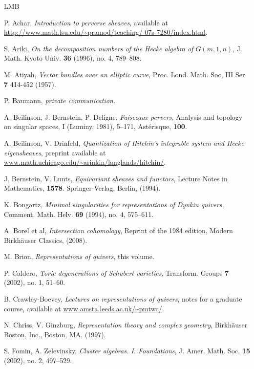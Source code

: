 \documentclass[a4paper,10pt]{amsart}
\numberwithin{equation}{section}
\begin{document}
\small{\begin{thebibliography}{LMB}

  P. Achar, \emph{Introduction to perverse sheaves}, available at \url{http://www.math.lsu.edu/~pramod/teaching/ 07s-7280/index.html}.

S. Ariki, \emph{On the decomposition numbers of the Hecke algebra of $G(m,1,n)$},
J. Math. Kyoto Univ. \textbf{36} (1996), no. 4, 789--808. 

M. Atiyah, \emph{Vector bundles over an elliptic curve}, Proc. Lond. Math. Soc, III Ser. \textbf{7} 414-452 (1957).

P. Baumann, \textit{private communication.}

A. Beilinson, J. Bernstein, P. Deligne, \emph{Faisceaux pervers}, Analysis and topology on singular spaces, I (Luminy, 1981),  5--171, Ast\'erisque, \textbf{100}.

  A. Beilinson, V. Drinfeld, \emph{Quantization of Hitchin's integrable system and Hecke eigensheaves}, preprint available at \url{www.math.uchicago.edu/~arinkin/langlands/hitchin/}.

J. Bernstein, V. Lunts, \emph{Equivariant sheaves and functors}, Lecture Notes in Mathematics, \textbf{1578}. Springer-Verlag, Berlin, (1994). 

K. Bongartz, \emph{Minimal singularities for representations of Dynkin quivers},
Comment. Math. Helv. \textbf{69} (1994), no. 4, 575--611. 

A. Borel et al, \emph{Intersection cohomology}, Reprint of the 1984 edition, Modern Birkhäuser Classics, (2008).

M. Brion, \emph{Representations of quivers}, this volume.

P. Caldero, \emph{Toric degenerations of Schubert varieties}, Transform. Groups  \textbf{7}  (2002),  no. 1, 51--60.

  B. Crawley-Boevey, \emph{Lectures on representations of quivers}, notes for a graduate course, available at \url{www.amsta.leeds.ac.uk/~pmtwc/}.

N. Chriss, V. Ginzburg, \emph{Representation theory and complex geometry}, Birkh\"auser Boston, Inc., Boston, MA, (1997). 

S. Fomin, A. Zelevinsky, \emph{Cluster algebras. I. Foundations},  J. Amer. Math. Soc. \textbf{15} (2002),  no. 2, 497--529.


\end{thebibliography}}
\end{document}
